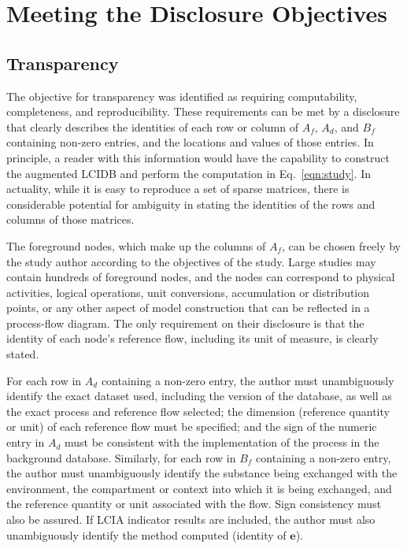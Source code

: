 


\section{Meeting the Disclosure Objectives}

\subsection{Transparency}

The objective for transparency was identified as requiring computability, completeness, and reproducibility.  These requirements can be met by a disclosure that clearly describes the identities of each row or column of $A_f$, $A_d$, and $B_f$ containing non-zero entries, and the locations and values of those entries.  In principle, a reader with this information would have the capability to construct the augmented LCIDB and perform the computation in Eq.~\ref{eqn:study}.  In actuality, while it is easy to reproduce a set of sparse matrices, there is considerable potential for ambiguity in stating the identities of the rows and columns of those matrices.

The foreground nodes, which make up the columns of $A_f$, can be chosen freely by the study author according to the objectives of the study.  Large studies may contain hundreds of foreground nodes, and the nodes can correspond to physical activities, logical operations, unit conversions, accumulation or distribution points, or any other aspect of model construction that can be reflected in a process-flow diagram.  The only requirement on their disclosure is that the identity of each node's reference flow, including its unit of measure, is clearly stated.  

For each row in $A_d$ containing a non-zero entry, the author must unambiguously identify the exact dataset used, including the version of the database, as well as the exact process and reference flow selected; the dimension (reference quantity or unit) of each reference flow must be specified; and the sign of the numeric entry in $A_d$ must be consistent with the implementation of the process in the background database.  Similarly, for each row in $B_f$ containing a non-zero entry, the author must unambiguously identify the substance being exchanged with the environment, the compartment or context into which it is being exchanged, and the reference quantity or unit associated with the flow.  Sign consistency must also be assured.  If LCIA indicator results are included, the author must also unambiguously identify the method computed (identity of $\mathbf{e}$).

